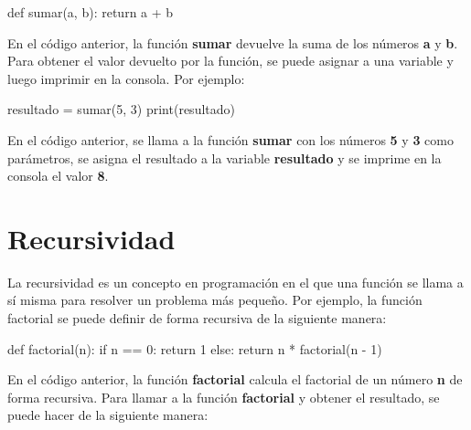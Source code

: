 \documentclass[
  a4paper,
  DIV=11,
  numbers=noendperiod,
  onepage,
  openany]{scrreprt}
\newenvironment{Shaded}{\begin{snugshade}}{\end{snugshade}}
\newcommand{\BuiltInTok}[1]{\textcolor[rgb]{0.00,0.23,0.31}{#1}}
\newcommand{\ControlFlowTok}[1]{\textcolor[rgb]{0.00,0.23,0.31}{#1}}
\newcommand{\DecValTok}[1]{\textcolor[rgb]{0.68,0.00,0.00}{#1}}
\newcommand{\KeywordTok}[1]{\textcolor[rgb]{0.00,0.23,0.31}{#1}}
\newcommand{\NormalTok}[1]{\textcolor[rgb]{0.00,0.23,0.31}{#1}}
\newcommand{\OperatorTok}[1]{\textcolor[rgb]{0.37,0.37,0.37}{#1}}
\begin{document}
\begin{Shaded}
\begin{Highlighting}[]
\KeywordTok{def}\NormalTok{ sumar(a, b):}
    \ControlFlowTok{return}\NormalTok{ a }\OperatorTok{+}\NormalTok{ b}
\end{Highlighting}
\end{Shaded}

En el código anterior, la función \textbf{sumar} devuelve la suma de los
números \textbf{a} y \textbf{b}. Para obtener el valor devuelto por la
función, se puede asignar a una variable y luego imprimir en la consola.
Por ejemplo:

\begin{Shaded}
\begin{Highlighting}[]
\NormalTok{resultado }\OperatorTok{=}\NormalTok{ sumar(}\DecValTok{5}\NormalTok{, }\DecValTok{3}\NormalTok{)}
\BuiltInTok{print}\NormalTok{(resultado)}
\end{Highlighting}
\end{Shaded}

En el código anterior, se llama a la función \textbf{sumar} con los
números \textbf{5} y \textbf{3} como parámetros, se asigna el resultado
a la variable \textbf{resultado} y se imprime en la consola el valor
\textbf{8}.

\section{Recursividad}\label{recursividad}

La recursividad es un concepto en programación en el que una función se
llama a sí misma para resolver un problema más pequeño. Por ejemplo, la
función factorial se puede definir de forma recursiva de la siguiente
manera:

\begin{Shaded}
\begin{Highlighting}[]
\KeywordTok{def}\NormalTok{ factorial(n):}
    \ControlFlowTok{if}\NormalTok{ n }\OperatorTok{==} \DecValTok{0}\NormalTok{:}
        \ControlFlowTok{return} \DecValTok{1}
    \ControlFlowTok{else}\NormalTok{:}
        \ControlFlowTok{return}\NormalTok{ n }\OperatorTok{*}\NormalTok{ factorial(n }\OperatorTok{{-}} \DecValTok{1}\NormalTok{)}
\end{Highlighting}
\end{Shaded}

En el código anterior, la función \textbf{factorial} calcula el
factorial de un número \textbf{n} de forma recursiva. Para llamar a la
función \textbf{factorial} y obtener el resultado, se puede hacer de la
siguiente manera:
\end{document}
